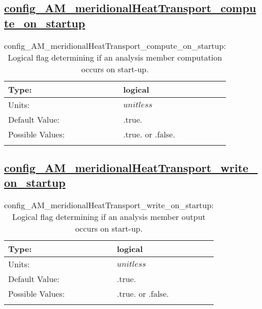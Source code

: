 \subsection[config\_AM\_meridionalHeatTransport\_compute\_on\_startup]{\hyperref[sec:nm_tab_AM_meridionalHeatTransport]{config\_AM\_meridionalHeatTransport\_compute\_on\_startup}}
\label{subsec:nm_sec_config_AM_meridionalHeatTransport_compute_on_startup}
\begin{center}
\begin{longtable}{| p{2.0in} || p{4.0in} |}
    \hline
    Type: & logical \\
    \hline
    Units: & $unitless$ \\
    \hline
    Default Value: & .true. \\
    \hline
    Possible Values: & .true. or .false. \\
    \hline
    \caption{config\_AM\_meridionalHeatTransport\_compute\_on\_startup: Logical flag determining if an analysis member computation occurs on start-up.}
\end{longtable}
\end{center}
\subsection[config\_AM\_meridionalHeatTransport\_write\_on\_startup]{\hyperref[sec:nm_tab_AM_meridionalHeatTransport]{config\_AM\_meridionalHeatTransport\_write\_on\_startup}}
\label{subsec:nm_sec_config_AM_meridionalHeatTransport_write_on_startup}
\begin{center}
\begin{longtable}{| p{2.0in} || p{4.0in} |}
    \hline
    Type: & logical \\
    \hline
    Units: & $unitless$ \\
    \hline
    Default Value: & .true. \\
    \hline
    Possible Values: & .true. or .false. \\
    \hline
    \caption{config\_AM\_meridionalHeatTransport\_write\_on\_startup: Logical flag determining if an analysis member output occurs on start-up.}
\end{longtable}
\end{center}
